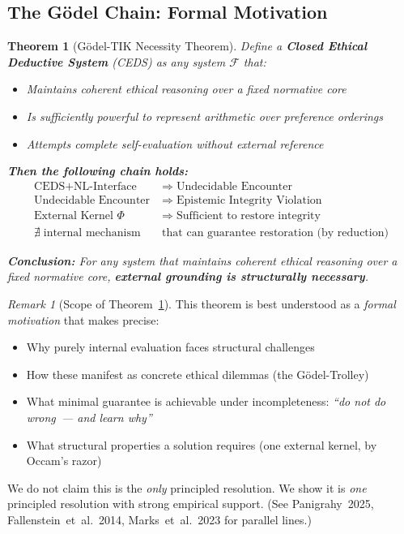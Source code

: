 \documentclass[11pt,a4paper]{article}
\newtheorem{theorem}{Theorem}[section]
\theoremstyle{definition}
\theoremstyle{remark}
\newtheorem{remark}{Remark}
\begin{document}
\subsection{The Gödel Chain: Formal Motivation}
\label{sec:godel-chain}

\begin{theorem}[Gödel-TIK Necessity Theorem]
\label{thm:godel-tik}
Define a \textbf{Closed Ethical Deductive System} (CEDS) as any
system $\mathcal{F}$ that:
\begin{itemize}[noitemsep]
  \item Maintains coherent ethical reasoning over a fixed normative core
  \item Is sufficiently powerful to represent arithmetic over
    preference orderings
  \item Attempts complete self-evaluation without external reference
\end{itemize}

\textbf{Then the following chain holds:}
\begin{align}
  \text{CEDS} + \text{NL-Interface}
    &\;\Longrightarrow\; \text{Undecidable Encounter}
    \label{eq:godel1}\\[4pt]
  \text{Undecidable Encounter}
    &\;\Longrightarrow\; \text{Epistemic Integrity Violation}
    \label{eq:godel2}\\[4pt]
  \text{External Kernel } \Phi
    &\;\Longrightarrow\; \text{Sufficient to restore integrity}
    \label{eq:godel3}\\[4pt]
  \nexists\; \text{internal mechanism}
    &\;\text{that can guarantee restoration (by reduction)}
    \label{eq:godel4}
\end{align}

\textbf{Conclusion:}
\textit{For any system that maintains coherent ethical reasoning
over a fixed normative core, \textbf{external grounding
is structurally necessary}.}
\end{theorem}

\begin{remark}[Scope of Theorem~\ref{thm:godel-tik}]
This theorem is best understood as a \textit{formal motivation}
that makes precise:
\begin{itemize}[noitemsep]
  \item Why purely internal evaluation faces structural challenges
  \item How these manifest as concrete ethical dilemmas
    (the Gödel-Trolley)
  \item What minimal guarantee is achievable under incompleteness:
    \textit{``do not do wrong~--- and learn why''}
  \item What structural properties a solution requires
    (one external kernel, by Occam's razor)
\end{itemize}
We do not claim this is the \textit{only} principled resolution.
We show it is \textit{one} principled resolution
with strong empirical support.
(See Panigrahy~2025, Fallenstein~et~al.~2014,
Marks~et~al.~2023 for parallel lines.)
\end{remark}
\end{document}
